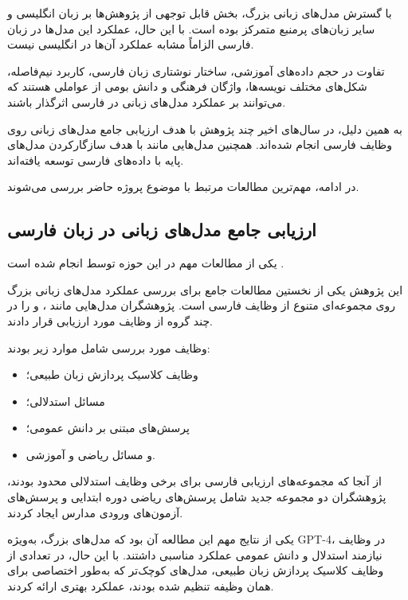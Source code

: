 با گسترش مدل‌های زبانی بزرگ، بخش قابل توجهی از پژوهش‌ها بر
زبان انگلیسی و سایر زبان‌های پرمنبع متمرکز بوده است.
با این حال، عملکرد این مدل‌ها در زبان فارسی الزاماً مشابه
عملکرد آن‌ها در انگلیسی نیست.

تفاوت در حجم داده‌های آموزشی، ساختار نوشتاری زبان فارسی،
کاربرد نیم‌فاصله، شکل‌های مختلف نویسه‌ها، واژگان فرهنگی و
دانش بومی از عواملی هستند که می‌توانند بر عملکرد مدل‌های
زبانی در فارسی اثرگذار باشند.

به همین دلیل، در سال‌های اخیر چند پژوهش با هدف ارزیابی جامع
مدل‌های زبانی روی وظایف فارسی انجام شده‌اند.
همچنین مدل‌هایی مانند
با هدف سازگارکردن مدل‌های پایه با داده‌های فارسی توسعه یافته‌اند.

در ادامه، مهم‌ترین مطالعات مرتبط با موضوع پروژه حاضر بررسی
می‌شوند.


\subsection{ارزیابی جامع مدل‌های زبانی در زبان فارسی}

یکی از مطالعات مهم در این حوزه توسط
انجام شده است
\cite{abaskohi2024persianllm}.

این پژوهش یکی از نخستین مطالعات جامع برای بررسی عملکرد
مدل‌های زبانی بزرگ روی مجموعه‌ای متنوع از وظایف فارسی است.
پژوهشگران مدل‌هایی مانند
،
و
را در چند گروه از وظایف مورد ارزیابی قرار دادند.

وظایف مورد بررسی شامل موارد زیر بودند:

\begin{itemize}

    \item وظایف کلاسیک پردازش زبان طبیعی؛

    \item مسائل استدلالی؛

    \item پرسش‌های مبتنی بر دانش عمومی؛

    \item و مسائل ریاضی و آموزشی.

\end{itemize}

از آنجا که مجموعه‌های ارزیابی فارسی برای برخی وظایف استدلالی
محدود بودند، پژوهشگران دو مجموعه جدید شامل پرسش‌های ریاضی
دوره ابتدایی و پرسش‌های آزمون‌های ورودی مدارس ایجاد کردند.

یکی از نتایج مهم این مطالعه آن بود که مدل‌های بزرگ، به‌ویژه
GPT-4، در وظایف نیازمند استدلال و دانش عمومی عملکرد مناسبی
داشتند.
با این حال، در تعدادی از وظایف کلاسیک پردازش زبان طبیعی،
مدل‌های کوچک‌تر که به‌طور اختصاصی برای همان وظیفه تنظیم شده
بودند، عملکرد بهتری ارائه کردند.

